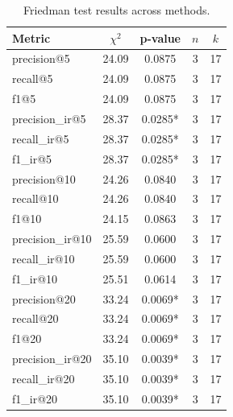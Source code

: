 \begin{table}[h]
\centering
\caption{Friedman test results across methods.}
\label{tab:friedman}
\begin{tabular}{lcccc}
\toprule
Metric & $\chi^2$ & p-value & $n$ & $k$ \\
\midrule
precision@5 & 24.09 & 0.0875 & 3 & 17 \\
recall@5 & 24.09 & 0.0875 & 3 & 17 \\
f1@5 & 24.09 & 0.0875 & 3 & 17 \\
precision_ir@5 & 28.37 & 0.0285* & 3 & 17 \\
recall_ir@5 & 28.37 & 0.0285* & 3 & 17 \\
f1_ir@5 & 28.37 & 0.0285* & 3 & 17 \\
precision@10 & 24.26 & 0.0840 & 3 & 17 \\
recall@10 & 24.26 & 0.0840 & 3 & 17 \\
f1@10 & 24.15 & 0.0863 & 3 & 17 \\
precision_ir@10 & 25.59 & 0.0600 & 3 & 17 \\
recall_ir@10 & 25.59 & 0.0600 & 3 & 17 \\
f1_ir@10 & 25.51 & 0.0614 & 3 & 17 \\
precision@20 & 33.24 & 0.0069* & 3 & 17 \\
recall@20 & 33.24 & 0.0069* & 3 & 17 \\
f1@20 & 33.24 & 0.0069* & 3 & 17 \\
precision_ir@20 & 35.10 & 0.0039* & 3 & 17 \\
recall_ir@20 & 35.10 & 0.0039* & 3 & 17 \\
f1_ir@20 & 35.10 & 0.0039* & 3 & 17 \\
\bottomrule
\end{tabular}
\end{table}
